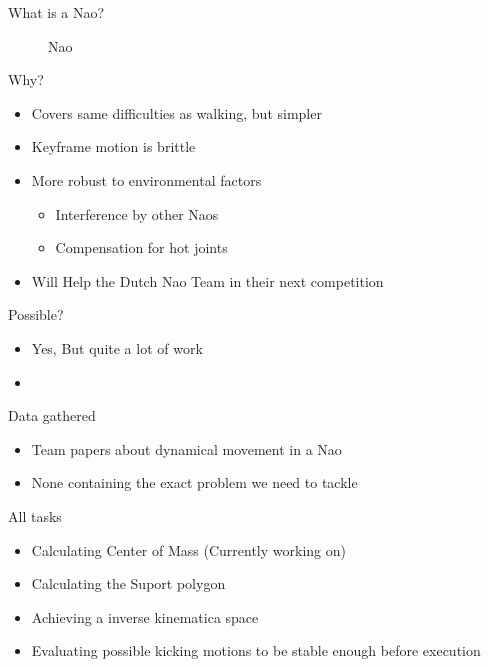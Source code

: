 \documentclass{beamer}
\begin{document}
\begin{frame}{What is a Nao?}
\begin{figure}[H]
\begin{center}
            \caption{Nao}
        \end{center}
    \end{figure}  
\end{frame}

\begin{frame}{Why?}
    \begin{itemize}
        \item{Covers same difficulties as walking, but simpler}
        \item{Keyframe motion is brittle}
        \item{More robust to environmental factors}
            \begin{itemize}
                \item{Interference by other Naos}
                \item{Compensation for hot joints}
            \end{itemize}
        \item{Will Help the Dutch Nao Team in their next competition}
    \end{itemize}
\end{frame}

\begin{frame}{Possible?}
    \begin{itemize}
        \item{Yes, But quite a lot of work}
        \item{}
    \end{itemize}
\end{frame}

\begin{frame}{Data gathered}
    \begin{itemize}
        \item{Team papers about dynamical movement in a Nao} 
        \item{None containing the exact problem we need to tackle}
    \end{itemize}
\end{frame}

\begin{frame}{All tasks}
    \begin{itemize}
        \item{Calculating Center of Mass (Currently working on)}
        \item{Calculating the Suport polygon}
        \item{Achieving a inverse kinematica space}
        \item{Evaluating possible kicking motions to be stable enough before
            execution}
    \end{itemize}
\end{frame}
\end{document}
